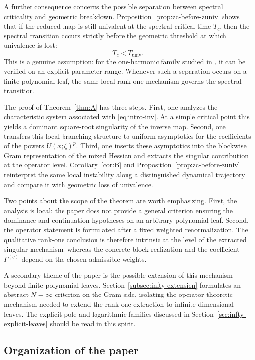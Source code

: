 \documentclass[11pt]{amsart}
\numberwithin{equation}{section}
\theoremstyle{plain}
\theoremstyle{definition}
\theoremstyle{remark}
\begin{document}
A further consequence concerns the possible separation between spectral
criticality and geometric breakdown. Proposition~\ref{prop:zc-before-zuniv}
shows that if the reduced map is still univalent at the spectral critical time
\(T_c\), then the spectral transition occurs strictly before the geometric
threshold at which univalence is lost:
\[
T_c<T_{\mathrm{univ}}.
\]
This is a genuine assumption: for the one-harmonic family studied in
\cite{Alekseev2025-1}, it can be verified on an explicit parameter range. Whenever such a
separation occurs on a finite polynomial leaf, the same local rank-one
mechanism governs the spectral transition.

The proof of Theorem~\ref{thm:A} has three steps. First, one analyzes the
characteristic system associated with \eqref{eq:intro-inv}. At a simple
critical point this yields a dominant square-root singularity of the inverse
map. Second, one transfers this local branching structure to uniform
asymptotics for the coefficients of the powers \(U(x;\zeta)^p\). Third, one
inserts these asymptotics into the blockwise Gram representation of the mixed
Hessian and extracts the singular contribution at the operator level.
Corollary~\ref{cor:B} and Proposition~\ref{prop:zc-before-zuniv} reinterpret the same local instability along a
distinguished dynamical trajectory and compare it with geometric loss of
univalence.

Two points about the scope of the theorem are worth emphasizing. First, the
analysis is local: the paper does not provide a general criterion ensuring the
dominance and continuation hypotheses on an arbitrary polynomial leaf.
Second, the operator statement is formulated after a fixed weighted
renormalization. The qualitative rank-one conclusion is therefore intrinsic at
the level of the extracted singular mechanism, whereas the concrete block
realization and the coefficient \(\Gamma^{(q)}\) depend on the chosen
admissible weights.

A secondary theme of the paper is the possible extension of this mechanism
beyond finite polynomial leaves. Section~\ref{subsec:infty-extension}
formulates an abstract \(N=\infty\) criterion on the Gram side, isolating the
operator-theoretic mechanism needed to extend the rank-one extraction to
infinite-dimensional leaves. The explicit pole and logarithmic families
discussed in Section~\ref{sec:infty-explicit-leaves} should be read in this
spirit.

\subsection{Organization of the paper}
\end{document}
